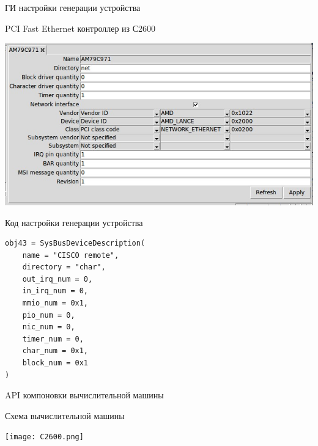 \documentclass[unicode,hyperref={unicode=true}]{beamer}
\theoremstyle{definition}
\theoremstyle{plain}
\begin{document}
\begin{frame}{ГИ настройки генерации устройства}
\begin{center}
PCI Fast Ethernet контроллер из С2600
\end{center}
\includegraphics[width=\linewidth]{AM79C971.jpg}
\end{frame}



\begin{frame}[fragile]{Код настройки генерации устройства}

\lstset{language=Python}
\begin{lstlisting}
obj43 = SysBusDeviceDescription(
    name = "CISCO remote",
    directory = "char",
    out_irq_num = 0,
    in_irq_num = 0,
    mmio_num = 0x1,
    pio_num = 0,
    nic_num = 0,
    timer_num = 0,
    char_num = 0x1,
    block_num = 0x1
)
\end{lstlisting}

\end{frame}



\begin{frame}[fragile]{API компоновки вычислительной машины}

\end{frame}



\begin{frame}{Схема вычислительной машины}
\begin{center}
\texttt{[image: C2600.png]}
\end{center}
\end{frame}
\end{document}
